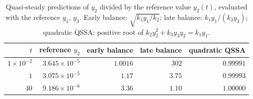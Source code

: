 \begin{table}[H]
\centering
\caption{Quasi-steady predictions of $y_2$ divided by the reference value $y_2(t)$, evaluated with the reference $y_1$, $y_3$. Early balance: $\sqrt{k_1y_1/k_2}$; late balance: $k_1y_1/(k_3y_3)$; quadratic QSSA: positive root of $k_2y_2^2+k_3y_3y_2=k_1y_1$.}
\label{tab:qssa}
\small
\begin{tabular}{rrrrr}
\toprule
$t$ & reference $y_2$ & early balance & late balance & quadratic QSSA\\
\midrule
$1\times10^{-2}$ & $3.645\times10^{-5}$ & $1.0016$ & $302$ & $0.99991$\\
$1$ & $3.075\times10^{-5}$ & $1.17$ & $3.75$ & $0.99993$\\
$40$ & $9.186\times10^{-6}$ & $3.36$ & $1.10$ & $1.00000$\\
\bottomrule
\end{tabular}
\end{table}
